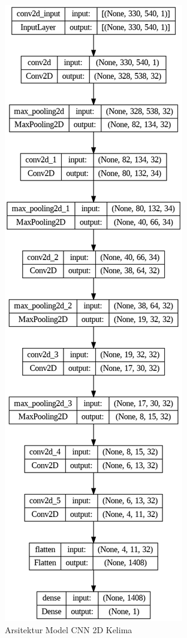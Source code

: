   \begin{figure} [H] \centering
    \includegraphics[scale=0.4]{gambar/bab3/cnnarc5.png}
    \caption{Arsitektur Model CNN 2D Kelima}
    \label{fig:cnnarc5}
  \end{figure}


